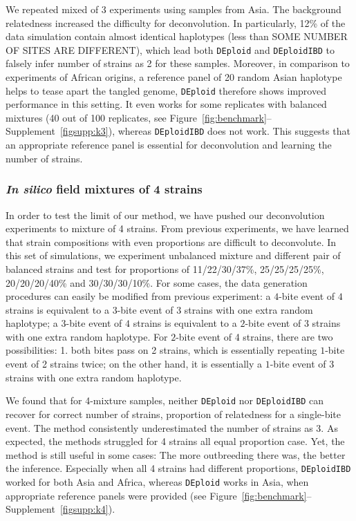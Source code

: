 \documentclass[9pt]{article}
\newcounter{todocounter}
\newcommand{\todonum}[2][]
{\stepcounter{todocounter}\todo[#1]{\thetodocounter: #2}}
\begin{document}
We repeated mixed of 3 experiments using samples from Asia. The background relatedness increased the difficulty for deconvolution. In particularly, 12\% of the data simulation contain almost identical haplotypes (less than \todonum{extract this number} SOME NUMBER OF SITES ARE DIFFERENT), which lead both {\tt DEploid} and {\tt DEploidIBD} to falsely infer number of strains as 2 for these samples. Moreover, in comparison to experiments of African origins, a reference panel of 20 random Asian haplotype helps to tease apart the tangled genome, {\tt DEploid} therefore shows improved performance in this setting. It even works for some replicates with balanced mixtures (40 out of 100 replicates, see Figure~\ref{fig:benchmark}--Supplement~\ref*{figsupp:k3}), whereas {\tt DEploidIBD} does not work. This suggests that an appropriate reference panel is essential for deconvolution and learning the number of strains.


\subsubsection{{\it In silico} field mixtures of 4 strains}

In order to test the limit of our method, we have pushed our deconvolution experiments to mixture of 4 strains. From previous experiments, we have learned that strain compositions with even proportions are difficult to deconvolute. In this set of simulations, we experiment unbalanced mixture and different pair of balanced strains and test for proportions of 11/22/30/37\%, 25/25/25/25\%, 20/20/20/40\% and 30/30/30/10\%. For some cases, the data generation procedures can easily be modified from previous experiment: a $4$-bite event of $4$ strains is equivalent to a $3$-bite event of 3 strains with one extra random haplotype; a $3$-bite event of $4$ strains is equivalent to a $2$-bite event of 3 strains with one extra random haplotype. For $2$-bite event of 4 strains, there are two possibilities: 1. both bites pass on 2 strains, which is essentially repeating $1$-bite event of 2 strains twice; on the other hand, it is essentially a $1$-bite event of 3 strains with one extra random haplotype.

We found that for 4-mixture samples, neither {\tt DEploid} nor {\tt DEploidIBD} can recover for correct number of strains, proportion of relatedness for a single-bite event. The method consistently underestimated the number of strains as 3. As expected, the methods struggled for 4 strains all equal proportion case. Yet, the method is still useful in some cases: The more outbreeding there was, the better the inference. Especially when all 4 strains had different proportions, {\tt DEploidIBD} worked for both Asia and Africa, whereas {\tt DEploid} works in Asia, when appropriate reference panels were provided (see Figure~\ref{fig:benchmark}--Supplement~\ref*{figsupp:k4}).
\end{document}
